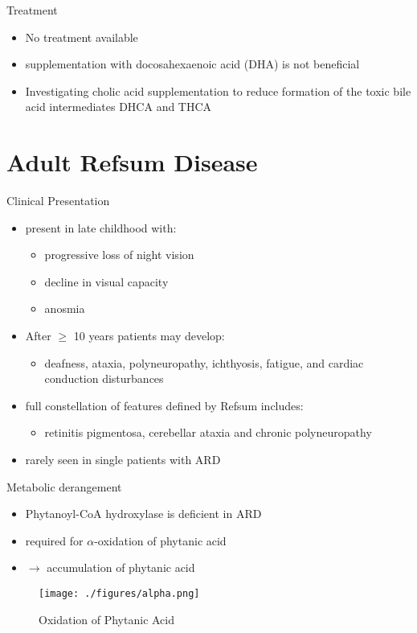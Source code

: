 \documentclass[presentation, smaller]{beamer}
\begin{document}
\begin{frame}[label={sec:orgf13ce7d}]{Treatment}
\begin{itemize}
\item No treatment available
\item supplementation with docosahexaenoic acid (DHA) is not beneficial
\item Investigating cholic acid supplementation to reduce formation of the
toxic bile acid intermediates DHCA and THCA
\end{itemize}
\end{frame}

\section{Adult Refsum Disease}
\label{sec:orgb0f7e27}
\begin{frame}[label={sec:org225f415}]{Clinical Presentation}
\begin{itemize}
\item present in late childhood with:
\begin{itemize}
\item progressive loss of night vision
\item decline in visual capacity
\item anosmia
\end{itemize}
\item After \(\ge\) 10 years patients may develop:
\begin{itemize}
\item deafness, ataxia, polyneuropathy, ichthyosis, fatigue, and cardiac
conduction disturbances
\end{itemize}
\item full constellation of features defined by Refsum includes:
\begin{itemize}
\item retinitis pigmentosa, cerebellar ataxia and chronic polyneuropathy
\end{itemize}
\item rarely seen in single patients with ARD
\end{itemize}
\end{frame}

\begin{frame}[label={sec:orgd50c6f1}]{Metabolic derangement}
\begin{itemize}
\item Phytanoyl-CoA hydroxylase is deficient in ARD
\item required for \(\alpha\)-oxidation of phytanic acid
\item \(\to\) accumulation of phytanic acid
\end{itemize}

\begin{figure}[htbp]
\centering
\texttt{[image: ./figures/alpha.png]}
\caption[oxidation of phytanic]{\label{fig:org9635189}
Oxidation of Phytanic Acid}
\end{figure}
\end{frame}
\end{document}
